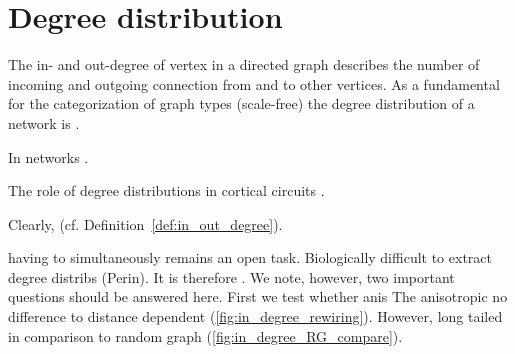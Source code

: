 
\section{Degree distribution}\label{sec:degree_distribution}

The in- and out-degree of vertex in a directed graph describes the
number of incoming and outgoing connection from and to other
vertices. As a fundamental for the categorization of graph types
(scale-free) the degree distribution of a network is .

In networks . 

The role of degree distributions in cortical circuits \parencite{Roxin2011}.

 Clearly, (cf. Definition~\ref{def:in_out_degree}).

 having to simultaneously remains an open task.
Biologically difficult to extract degree distribs (Perin). It is
therefore . We note, however, two important questions should be answered
here. First we test whether anis The anisotropic no difference to
distance dependent (\autoref{fig:in_degree_rewiring}). However, long
tailed in comparison to random graph
(\autoref{fig:in_degree_RG_compare}).




